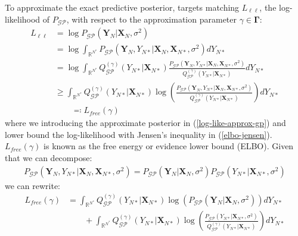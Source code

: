 \documentclass{article}
\newcommand{\GP}{\operatorname{\mathcal{GP}}}
\numberwithin{equation}{section}
\begin{document}
To approximate the exact predictive posterior, \cite{titsias2009variational} targets matching $L_{\ell \ell}$, the log-likelihood of $P_{\GP}$, with respect to the approximation parameter $\gamma \in \boldsymbol{\Gamma}$:
\begin{align}
    L_{\ell \ell} &= \log P_{\GP}\left(\mathbf{Y}_N \vert \mathbf{X}_N, \sigma^2\right) \\ 
     \label{log-like}
    &= \log \int_{\mathbb{R}^{N^*}} P_{\GP}\left(\mathbf{Y}_N, Y_{N*} \vert \mathbf{X}_{N}, \mathbf{X}_{N*}, \sigma^2\right) d Y_{N*} \\
     \label{log-like-approx-gp}
&= \log \int_{\mathbb{R}^{N^*}} Q^{(\gamma)}_{\GP}\left(Y_{N*} \vert \mathbf{X}_{N*}\right) \frac{P_{\GP}\left(\mathbf{Y}_N, Y_{N*} \vert \mathbf{X}_{N}, \mathbf{X}_{N*}, \sigma^2\right)}{Q^{(\gamma)}_{\GP}\left(Y_{N*} \vert \mathbf{X}_{N*}\right)} d Y_{N*}\\
&\geq \int_{\mathbb{R}^{N^*}} Q^{(\gamma)}_{\GP}\left(Y_{N*} \vert \mathbf{X}_{N*}\right) \log\left(\frac{P_{\GP}\left(\mathbf{Y}_N, Y_{N*} \vert \mathbf{X}_{N}, \mathbf{X}_{N*}, \sigma^2\right)}{Q^{(\gamma)}_{\GP}\left(Y_{N*} \vert \mathbf{X}_{N*}\right)} \right)d Y_{N*}
 \label{elbo-jensen}
 \\ & \qquad \eqqcolon L_{free}(\gamma)
 \label{elbo-definition}
\end{align}
where we introducing the approximate posterior in (\ref{log-like-approx-gp}) and lower bound the log-likelihood with Jensen's inequality in (\ref{elbo-jensen}). $L_{free}(\gamma)$ is known as the free energy or evidence lower bound (ELBO). Given that we can decompose:
\begin{align}
    P_{\GP}\left(\mathbf{Y}_N, Y_{N*} \vert \mathbf{X}_{N}, \mathbf{X}_{N*}, \sigma^2\right) = P_{\GP} \left(\mathbf{Y}_N \vert \mathbf{X}_{N}, \sigma^2\right) P_{\GP}\left(Y_{N*}\vert \mathbf{X}_{N*}, \sigma^2 \right)
    \label{decomposed-numerator}
\end{align}
we can rewrite:
\begin{align}
    L_{free}(\gamma) &= \int_{\mathbb{R}^{N^*}} Q^{(\gamma)}_{\GP}(Y_{N*} \vert \mathbf{X}_{N*}) \log \left(P_{\GP}\left(\mathbf{Y}_N \vert \mathbf{X}_{N}, \sigma^2\right)\right) d Y_{N*} \nonumber
    \\ & \qquad + \int_{\mathbb{R}^{N^*}} Q^{(\gamma)}_{\GP}(Y_{N*} \vert \mathbf{X}_{N*}) \log \left(\frac{P_{\GP}\left( Y_{N*} \vert \mathbf{X}_{N*}, \sigma^2\right) }{Q^{(\gamma)}_{\GP}\left(Y_{N*} \vert \mathbf{X}_{N*}\right)}\right) d Y_{N*}
    \label{elbo-broken-down}
\end{align}
\end{document}
